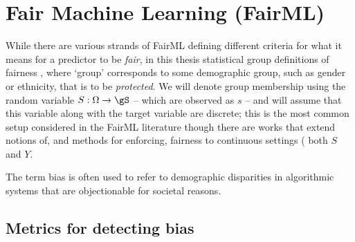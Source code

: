 \section{Fair Machine Learning (FairML)}\label{sec:fairml}
%
While there are various strands of FairML defining different criteria for what it means for a
predictor to be \emph{fair}, in this thesis statistical group definitions of fairness
\citep{barocas2019fairness}, where `group' corresponds to some demographic group, such as gender or
ethnicity, that is to be \emph{protected}.
%
We will denote group membership using the random variable \( S: \Omega \to \gS \) -- which are
observed as \(s\) -- and will assume that this variable along with the target variable are
discrete; this is the most common setup considered in the FairML literature though there are works
that extend notions of, and methods for enforcing, fairness to continuous settings (\wrt{} both
\(S\) and \(Y\).
%

The term bias is often used to refer to demographic disparities in algorithmic systems that are
objectionable for societal reasons.

\subsection{Metrics for detecting bias}\label{ssec:bias-metrics}
%
